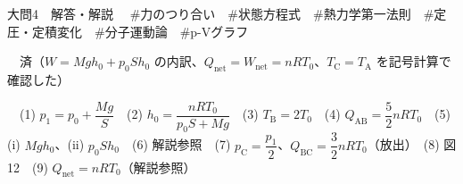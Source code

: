 \documentclass[paper=b5, fontsize=8pt, fleqn, twoside]{jlreq}
\begin{document}
\begin{ascolorbox4A}[75点・30分]{大問4　解答・解説}
　\#力のつり合い　\#状態方程式　\#熱力学第一法則　\#定圧・定積変化　\#分子運動論　\#p-Vグラフ\par
{}　済（$W=Mgh_0+p_0Sh_0$ の内訳、$Q_\mathrm{net}=W_\mathrm{net}=nRT_0$、$T_\mathrm{C}=T_\mathrm{A}$ を記号計算で確認した）\par
{}　(1) $p_1=p_0+\dfrac{Mg}{S}$　(2) $h_0=\dfrac{nRT_0}{p_0S+Mg}$　(3) $T_\mathrm{B}=2T_0$　(4) $Q_\mathrm{AB}=\dfrac{5}{2}nRT_0$　(5) (i) $Mgh_0$、(ii) $p_0Sh_0$　(6) 解説参照　(7) $p_\mathrm{C}=\dfrac{p_1}{2}$、$Q_\mathrm{BC}=\dfrac{3}{2}nRT_0$（放出）　(8) 図 12　(9) $Q_\mathrm{net}=nRT_0$（解説参照）
\end{ascolorbox4A}
\end{document}
